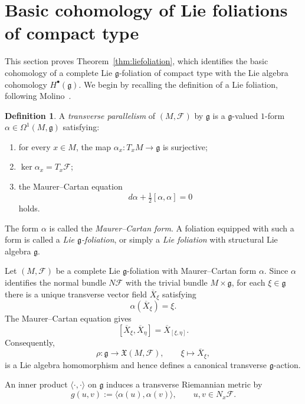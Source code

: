 \documentclass[reqno, 11pt]{amsart}
\theoremstyle{definition}
\newtheorem{defn}[thm]{Definition}
\theoremstyle{property}
\theoremstyle{remark}
\numberwithin{equation}{section}
\begin{document}
\section{Basic cohomology of Lie foliations of compact type}
\label{App:Lie-foliation}

This section proves Theorem~\ref{thm:liefoliation}, which identifies the
basic cohomology of a complete Lie $\mathfrak g$-foliation of compact type
with the Lie algebra cohomology $H^\bullet(\mathfrak g)$. We begin by
recalling the definition of a Lie foliation, following Molino~\cite{Mo88}.

\begin{defn}\label{lie-g-foliation}
A \emph{transverse parallelism} of $(M,\mathcal F)$ by $\mathfrak g$ is a
$\mathfrak g$-valued $1$-form
$\alpha\in\Omega^1(M,\mathfrak g)$ satisfying:
\begin{enumerate}
\item[(i)] for every $x\in M$, the map
$\alpha_x:T_xM\to\mathfrak g$ is surjective;
\item[(ii)] $\ker\alpha_x=T_x\mathcal F$;
\item[(iii)] the Maurer--Cartan equation
\begin{equation}\label{MC-eq}
d\alpha+\tfrac12[\alpha,\alpha]=0
\end{equation}
holds.
\end{enumerate}
The form $\alpha$ is called the \emph{Maurer--Cartan form}. A foliation
equipped with such a form is called a \emph{Lie $\mathfrak g$-foliation},
or simply a \emph{Lie foliation} with structural Lie algebra $\mathfrak g$.
\end{defn}

Let $(M,\mathcal F)$ be a complete Lie $\mathfrak g$-foliation with
Maurer--Cartan form $\alpha$. Since $\alpha$ identifies the normal bundle
$N\mathcal F$ with the trivial bundle $M\times\mathfrak g$, for each
$\xi\in\mathfrak g$ there is a unique transverse vector field
$\overline X_\xi$ satisfying
\[
\alpha(\overline X_\xi)=\xi.
\]
The Maurer--Cartan equation gives
\[
[\overline X_\xi,\overline X_\eta]
=
\overline X_{[\xi,\eta]}.
\]
Consequently,
\begin{equation}\label{canonical-action}
\rho:\mathfrak g\longrightarrow\mathfrak X(M,\mathcal F),
\qquad
\xi\longmapsto\overline X_\xi,
\end{equation}
is a Lie algebra homomorphism and hence defines a canonical transverse
$\mathfrak g$-action.

An inner product $\langle\cdot,\cdot\rangle$ on $\mathfrak g$ induces a
transverse Riemannian metric by
\begin{equation}\label{in-metric}
g(u,v)
:=
\langle\alpha(u),\alpha(v)\rangle,
\qquad
u,v\in N_x\mathcal F.
\end{equation}
\end{document}
